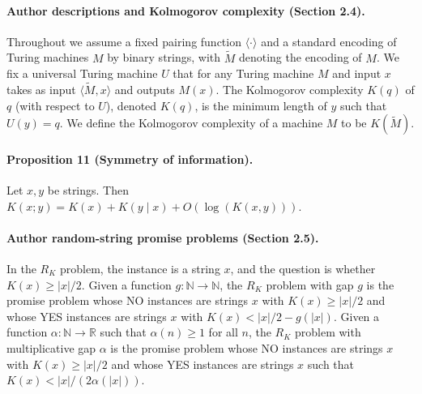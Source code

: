 \paragraph{Author descriptions and Kolmogorov complexity (Section 2.4).}
Throughout we assume a fixed pairing function $\langle\cdot\rangle$ and a standard encoding of Turing machines $M$ by binary strings, with $\widetilde M$ denoting the encoding of $M$.
We fix a universal Turing machine $U$ that for any Turing machine $M$ and input $x$ takes as input $\langle\widetilde M,x\rangle$ and outputs $M(x)$. The Kolmogorov complexity $K(q)$ of $q$ (with respect to $U$), denoted $K(q)$, is the minimum length of $y$ such that $U(y)=q$. We define the Kolmogorov complexity of a machine $M$ to be $K(\widetilde M)$.
\paragraph{Proposition 11 (Symmetry of information).}
Let $x,y$ be strings. Then $K(x;y)=K(x)+K(y\mid x)+O(\log(K(x,y)))$.
\paragraph{Author random-string promise problems (Section 2.5).}
In the $R_K$ problem, the instance is a string $x$, and the question is whether $K(x)\geq|x|/2$. Given a function $g:\mathbb N\to\mathbb N$, the $R_K$ problem with gap $g$ is the promise problem whose NO instances are strings $x$ with $K(x)\geq|x|/2$ and whose YES instances are strings $x$ with $K(x)<|x|/2-g(|x|)$. Given a function $\alpha:\mathbb N\to\mathbb R$ such that $\alpha(n)\geq1$ for all $n$, the $R_K$ problem with multiplicative gap $\alpha$ is the promise problem whose NO instances are strings $x$ with $K(x)\geq|x|/2$ and whose YES instances are strings $x$ such that $K(x)<|x|/(2\alpha(|x|))$.
